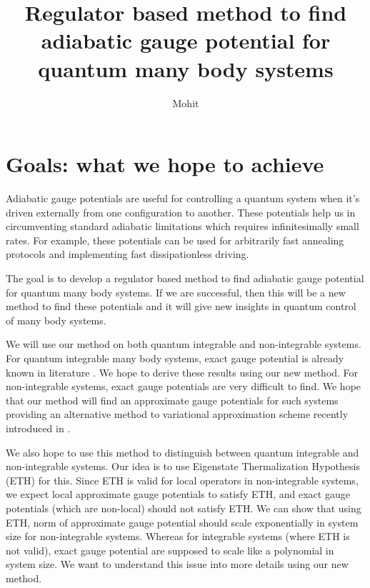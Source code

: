 \documentclass[11pt,a4paper]{article}
\author{Mohit}
\title{Regulator based method to find adiabatic gauge potential for quantum many body systems }
\begin{document}
\maketitle

\section{Goals: what we hope to achieve}


Adiabatic gauge potentials are useful for controlling a quantum system when it's driven externally from one configuration to another. These potentials help us in  circumventing standard adiabatic limitations which requires infinitesimally small rates. For example, these potentials can be used for arbitrarily fast annealing protocols and implementing fast dissipationless driving. 


The goal is to develop a regulator based method to find adiabatic gauge potential for quantum many body systems. If we are successful, then this will be a new method to find these potentials and it will give new insights in quantum control of many body systems. 

We will use our method on both quantum integrable and non-integrable systems. For quantum integrable many body systems, exact gauge potential is already known in literature \cite{del2012assisted, kolodrubetz2016geometry}. We hope to derive these results using our new method. For non-integrable systems, exact gauge potentials are very difficult to find. We hope that our method will find an approximate gauge potentials for such systems providing an alternative method to variational approximation scheme recently introduced in \cite{del2012assisted}.

We also hope to use this method to distinguish between quantum integrable and non-integrable systems. Our idea is to use  Eigenstate Thermalization Hypothesis (ETH) for this. Since ETH is valid for local operators in non-integrable systems, we expect local approximate gauge potentials to satisfy ETH, and exact gauge potentials (which are non-local) should not satisfy ETH. We can show that  using ETH, norm of approximate gauge potential should scale exponentially in system size for non-integrable systems. Whereas for integrable systems (where ETH is not valid), exact gauge potential are supposed to scale like a polynomial in system size. We want to understand this issue into more details using our new method.


\end{document}
